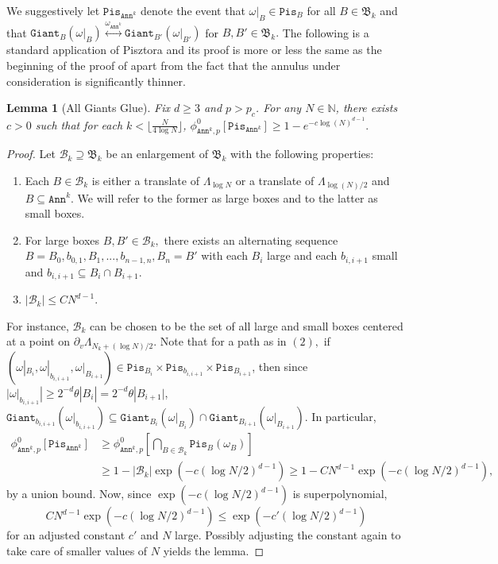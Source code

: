 \documentclass[article,11pt,reqno]{amsart}
\newcommand{\N}{\mathbb{N}}
\newcommand{\ak}{\mathtt{Ann}^k}
\newtheorem{lemma}[theorem]{Lemma}
\begin{document}
\begin{appendix}
We suggestively let $\mathtt{Pis}_{\ak}$ denote the event that $\omega|_{B}\in \mathtt{Pis}_{B}$ for all $B\in \mathfrak{B}_k$ and that $\mathtt{Giant}_B(\omega|_B)\overset{\omega_{\ak}}{\longleftrightarrow} \mathtt{Giant}_{B'}(\omega|_{B'})$ for $B,B'\in \mathfrak{B}_k.$ The following is a standard application of Pisztora and its proof is more or less the same as the beginning of the proof of \cite[Lemma 4.8]{hansen2023uniform} apart from the fact that the annulus under consideration is significantly thinner.
\begin{lemma}[All Giants Glue] \label{lemma:all_giants_glue}
Fix $d\geq 3$ and $p>p_c$. For any $N \in \N$, there exists $c>0$ such that for each $k < \lfloor \frac{N}{4\log N}\rfloor$,
$
\phi^0_{\ak,p}[\mathtt{Pis}_{\ak}]\geq 1- e^{-c\log(N)^{d-1}}.
$
\end{lemma}
\begin{proof}
Let $\mathscr{B}_k\supseteq \mathfrak{B}_k$ be an enlargement of $\mathfrak{B}_k$ with the following properties: 
\begin{enumerate}
    \item Each $B\in \mathscr{B}_k$ is either a translate of $\Lambda_{\log N}$ or a translate of $\Lambda_{\log(N)/2}$ and $B\subseteq \ak$. We will refer to the former as large boxes and to the latter as small boxes.
    \item For large boxes $B,B'\in \mathscr{B}_k,$ there exists an alternating sequence $B=B_0, b_{0,1},B_1,...,b_{n-1,n},B_n=B'$ with each $B_i$ large and each $b_{i,i+1}$ small and $b_{i,i+1}\subseteq B_i\cap B_{i+1}.$
    \item $|\mathscr{B}_k|\leq C N^{d-1}.$
\end{enumerate} 
For instance, $\mathscr{B}_k$ can be chosen to be the set of all large and small boxes centered at a point on $\partial_v \Lambda_{N_k+(\log N)/2}$. Note that for a path as in $(2),$ if $(\omega|  _{B_i},\omega|_{b_{i,i+1}},\omega|_{B_{i+1}})\in \mathtt{Pis}_{B_i}\times \mathtt{Pis}_{b_{i,i+1}}\times \mathtt{Pis}_{B_{i+1}}$, then since $|\omega|_{b_{i,i+1}}|\geq 2^{-d}\theta |B_i|=2^{-d}\theta|B_{i+1}|$, $\mathtt{Giant}_{b_{i,i+1}}(\omega|_{b_{i,i+1}})\subseteq 
\mathtt{Giant}_{B_i}(\omega|_{B_i})\cap \mathtt{Giant}_{B_{i+1}}(\omega|_{B_{i+1}})$. In particular,
\begin{align*}
   \phi^0_{\ak,p}[\mathtt{Pis}_{\ak}] &\geq \phi^0_{\ak,p}\left[\bigcap_{B\in \mathscr{B}_k} \mathtt{Pis}_{B}(\omega_B)\right] \\ 
   &\geq 1-|\mathscr{B}_k|\exp(-c(\log N/2)^{d-1})\geq 1-CN^{d-1}\exp(-c(\log N/2)^{d-1}),
\end{align*}
by a union bound. Now, since $\exp(-c(\log N/2)^{d-1})$ is superpolynomial, 
$$
CN^{d-1}\exp(-c(\log N/2)^{d-1})\leq \exp(-c'(\log N/2)^{d-1})
$$
for an adjusted constant $c'$ and $N$ large. Possibly adjusting the constant again to take care of smaller values of $N$ yields the lemma.
\end{proof}



\end{appendix}
\end{document}
